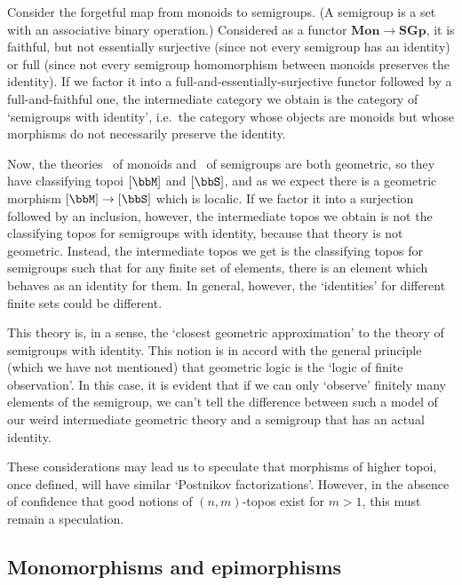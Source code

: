 \documentclass[12pt]{amsart}
\begin{document}
\begin{eg}
  Consider the forgetful map from monoids to semigroups.  (A semigroup
  is a set with an associative binary operation.)  Considered as a
  functor $\mathbf{Mon}\to\mathbf{SGp}$, it is faithful, but not
  essentially surjective (since not every semigroup has an identity)
  or full (since not every semigroup homomorphism between monoids
  preserves the identity).  If we factor it into a
  full-and-essentially-surjective functor followed by a
  full-and-faithful one, the intermediate category we obtain is the
  category of `semigroups with identity', i.e.\ the category whose
  objects are monoids but whose morphisms do not necessarily preserve
  the identity.

  Now, the theories \bbM\ of monoids and \bbS\ of semigroups are both
  geometric, so they have classifying topoi $[\bbM]$ and $[\bbS]$, and
  as we expect there is a geometric morphism $[\bbM]\to [\bbS]$ which
  is localic.  If we factor it into a surjection followed by an
  inclusion, however, the intermediate topos we obtain is not the
  classifying topos for semigroups with identity, because that theory
  is not geometric.  Instead, the intermediate topos we get is the
  classifying topos for semigroups such that for any finite set of
  elements, there is an element which behaves as an identity for them.
  In general, however, the `identities' for different finite sets
  could be different.

  This theory is, in a sense, the `closest geometric approximation' to
  the theory of semigroups with identity.  This notion is in accord
  with the general principle (which we have not mentioned) that
  geometric logic is the `logic of finite observation'.  In this case,
  it is evident that if we can only `observe' finitely many elements
  of the semigroup, we can't tell the difference between such a model
  of our weird intermediate geometric theory and a semigroup that has
  an actual identity.
\end{eg}

These considerations may lead us to speculate that morphisms of higher
topoi, once defined, will have similar `Postnikov factorizations'.
However, in the absence of confidence that good notions of $(n,m)$-topos
exist for $m>1$, this must remain a speculation.

\subsection{Monomorphisms and epimorphisms}
\label{sec:monom-epim}
\end{document}

